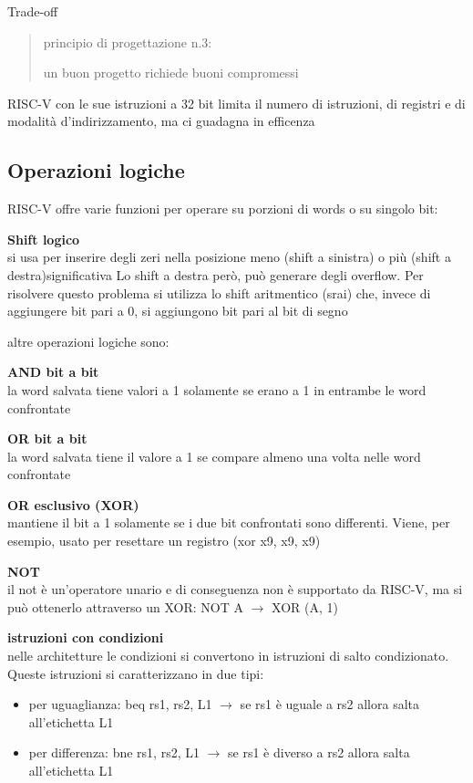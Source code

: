 \documentclass[12pt, a4paper]{article}
\begin{document}
Trade-off 
\begin{quote}
  \center principio di progettazione n.3: 

  un buon progetto richiede buoni compromessi
\end{quote}


RISC-V con le sue istruzioni a 32 bit limita il numero di istruzioni, di registri e di modalità d'indirizzamento,
ma ci guadagna in efficenza

\subsection{Operazioni logiche}
RISC-V offre varie funzioni per operare su porzioni di words o su singolo bit:

\textbf{Shift logico}\\
si usa per inserire degli zeri nella posizione meno (shift a sinistra) o più (shift a destra)significativa 
Lo shift a destra però, può generare degli overflow. Per risolvere questo problema si utilizza lo shift aritmentico
(srai) che, invece di aggiungere bit pari a 0, si aggiungono bit pari al bit di segno

\newpage
altre operazioni logiche sono:

\textbf{AND bit a bit}\\ la word salvata tiene valori a 1 solamente se erano a 1 in entrambe le word confrontate

\textbf{OR bit a bit}\\ la word salvata tiene il valore a 1 se compare almeno una volta nelle word confrontate

\textbf{OR esclusivo (XOR)}\\mantiene il bit a 1 solamente se i due bit confrontati sono differenti.
Viene, per esempio, usato per resettare un registro (xor x9, x9, x9)

\textbf{NOT}\\
il not è un'operatore unario e di conseguenza non è supportato da RISC-V, ma si può ottenerlo
attraverso un XOR: NOT A $\rightarrow$ XOR (A, 1)

\textbf{istruzioni con condizioni}\\
nelle architetture le condizioni si convertono in istruzioni di salto condizionato. Queste istruzioni si
caratterizzano in due tipi:
\begin{itemize}
  \item per uguaglianza: beq rs1, rs2, L1 $\rightarrow$ se rs1 è uguale a rs2 allora salta all'etichetta L1
  \item per differenza: bne rs1, rs2, L1 $\rightarrow$ se rs1 è diverso a rs2 allora salta all'etichetta L1
\end{itemize}
\end{document}
